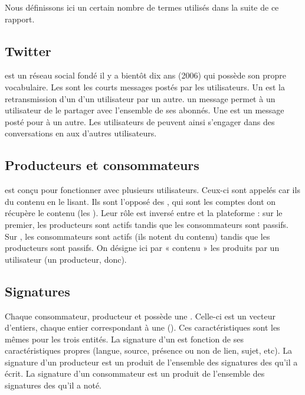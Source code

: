 Nous définissons ici un certain nombre de termes utilisés dans la suite de ce
rapport.

\subsection{Twitter}

\twt{} est un réseau social fondé il y a bientôt dix ans (2006) qui possède son
propre vocabulaire. Les \I{\tweets{}} sont les courts messages postés par les
utilisateurs. Un \I{\rt{}} est la retransmission d’un \tweet{} d’un utilisateur
par un autre.  un message permet à un utilisateur de le partager
avec l’ensemble de ses abonnés. Une  est un message posté pour
 à un autre. Les utilisateurs de \twt{} peuvent ainsi s’engager
dans des conversations en  aux \tweets{} d’autres utilisateurs.

\subsection{Producteurs et consommateurs}

\tb{} est conçu pour fonctionner avec plusieurs utilisateurs. Ceux-ci sont
appelés  car ils  du contenu en le lisant. Ils
sont l’opposé des , qui sont les comptes \twt{} dont on récupère
le contenu (les \tweets{}). Leur rôle est inversé entre \twt{} et la plateforme
\tb{} : sur le premier, les producteurs sont actifs tandis que les
consommateurs sont passifs. Sur \tb{}, les consommateurs sont actifs (ils
notent du contenu) tandis que les producteurs sont passifs. On désigne ici par
« contenu » les \I{\tweets{}} produits par un utilisateur (un producteur,
donc).

\subsection{Signatures}

Chaque consommateur, producteur et \tweet{} possède une . Celle-ci
est un vecteur d’entiers, chaque entier correspondant à une 
(). Ces caractéristiques sont les mêmes pour les trois entités. La
signature d’un \tweet{} est fonction de ses caractéristiques propres (langue,
source, présence ou non de lien, sujet, etc). La signature d’un producteur est
un produit de l’ensemble des signatures des \tweets{} qu’il a écrit. La
signature d’un consommateur est un produit de l’ensemble des signatures des
\tweets{} qu’il a noté.
